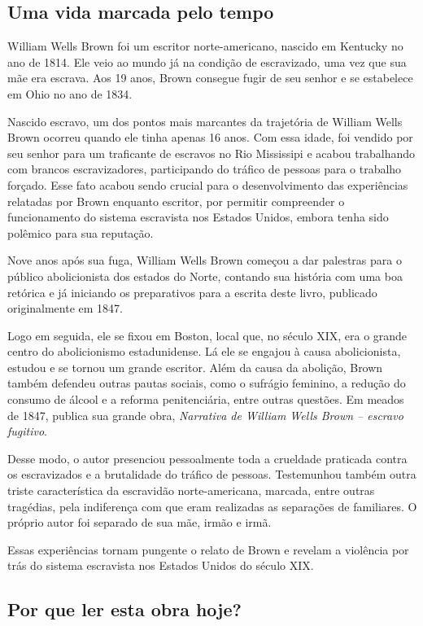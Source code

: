 \documentclass[11pt]{extarticle}
\begin{document}
\subsection{Uma vida marcada pelo tempo}

William Wells Brown foi um escritor norte-americano, nascido em
Kentucky no ano de 1814. Ele veio ao mundo já na condição de
escravizado, uma vez que sua mãe era escrava. Aos 19 anos, Brown
consegue fugir de seu senhor e se estabelece em Ohio no ano de 1834.

Nascido escravo, um dos pontos mais marcantes da trajetória de William
Wells Brown ocorreu quando ele tinha apenas 16 anos. Com essa idade, foi
vendido por seu senhor para um traficante de escravos no Rio Mississipi
e acabou trabalhando com brancos escravizadores, participando do tráfico
de pessoas para o trabalho forçado. Esse fato acabou sendo crucial para
o desenvolvimento das experiências relatadas por Brown enquanto
escritor, por permitir compreender o funcionamento do sistema escravista
nos Estados Unidos, embora tenha sido polêmico para sua reputação.

Nove anos após sua fuga, William Wells Brown começou a dar palestras
para o público abolicionista dos estados do Norte, contando sua história
com uma boa retórica e já iniciando os preparativos para a escrita deste
livro, publicado originalmente em 1847.

Logo em seguida, ele se fixou em Boston, local que, no século XIX, era o
grande centro do abolicionismo estadunidense. Lá ele se engajou à causa
abolicionista, estudou e se tornou um grande escritor. Além da causa da
abolição, Brown também defendeu outras pautas sociais, como o sufrágio
feminino, a redução do consumo de álcool e a reforma penitenciária,
entre outras questões. Em meados de 1847, publica sua grande obra,
\emph{Narrativa de William Wells Brown -- escravo fugitivo}.

Desse modo, o autor presenciou pessoalmente toda a crueldade praticada
contra os escravizados e a brutalidade do tráfico de pessoas.
Testemunhou também outra triste característica da escravidão
norte-americana, marcada, entre outras tragédias, pela indiferença com
que eram realizadas as separações de familiares. O próprio autor foi
separado de sua mãe, irmão e irmã.

Essas experiências tornam pungente o relato de Brown e revelam a
violência por trás do sistema escravista nos Estados Unidos do século
XIX.

\subsection{Por que ler esta obra hoje?}
\end{document}
